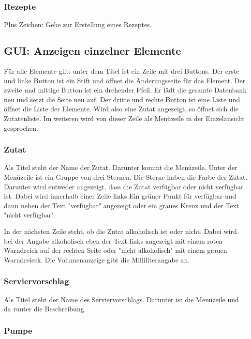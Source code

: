{\subsubsection{Rezepte}

Plus Zeichen: Gehe zur Erstellung eines Rezeptes.

\subsection{GUI: Anzeigen einzelner Elemente}

Für alle Elemente gilt: unter dem Titel ist ein Zeile mit drei Buttons. Der erste und linke Button ist ein Stift und öffnet die Änderungsseite für das Element. Der zweite und mittige Button ist ein drehender Pfeil. Er lädt die gesamte Datenbank neu und setzt die Seite neu auf. Der dritte und rechte Button ist eine Liste und öffnet die Liste der Elemente. Wird also eine Zutat angezeigt, so öffnet sich die Zutatenliste. Im weiteren wird von dieser Zeile als Menüzeile in der Einzelansicht gesprochen.

\subsubsection{Zutat}

Als Titel steht der Name der Zutat. Darunter kommt die Menüzeile. Unter der Menüzeile ist ein Gruppe von drei Sternen. Die Sterne haben die Farbe der Zutat. Darunter wird entweder angezeigt, dass die Zutat verfügbar oder nicht verfügbar ist. Dabei wird innerhalb einer Zeile links Ein grüner Punkt für verfügbar und dann neben der Text "verfügbar" angezeigt oder ein graues Kreuz und der Text "nicht verfügbar".

In der nächsten Zeile steht, ob die Zutat alkoholisch ist oder nicht. Dabei wird bei der Angabe alkoholisch eben der Text links angezeigt mit einem roten Warndreick auf der rechten Seite oder "nicht alkoholisch" mit einem grauen Warndreieck. Die Volumenanzeige gibt die Milliliterangabe an.

\subsubsection{Serviervorschlag}

Als Titel steht der Name des Serviervorschlags. Darunter ist die Menüzeile und da runter die Beschreibung.

\subsubsection{Pumpe}

}
